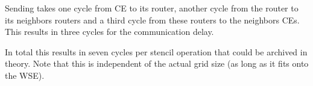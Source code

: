 \documentclass{article}
\begin{document}
Sending takes one cycle from CE to its router, another cycle from the router to its neighbors routers and a third cycle from these routers to the neighbors CEs. This results in three cycles for the communication delay.

In total this results in seven cycles per stencil operation that could be archived in theory.
Note that this is independent of the actual grid size (as long as it fits onto the WSE).

\end{document}
